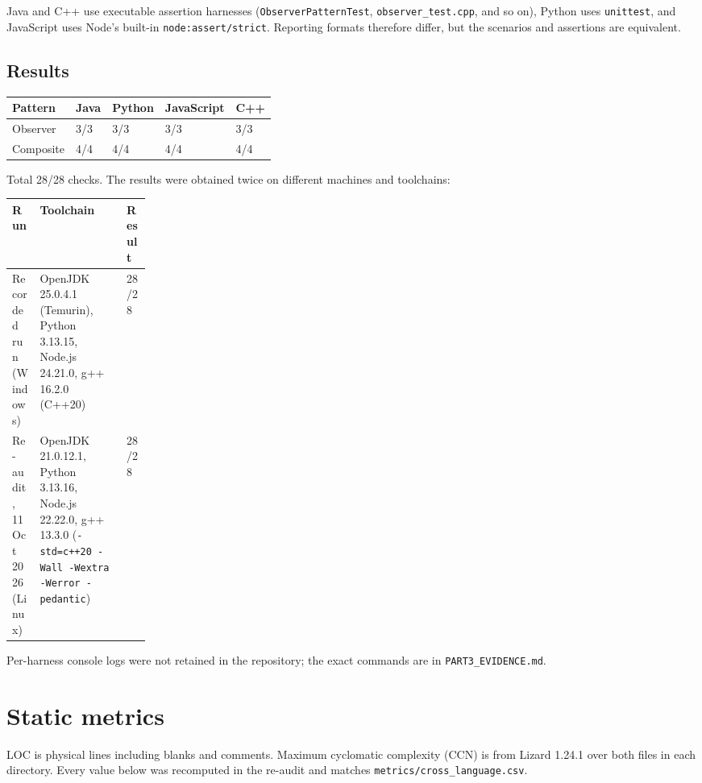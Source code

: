 \documentclass[11pt,a4paper]{article}
\newcommand{\code}[1]{\nolinkurl{#1}}
\begin{document}
Java and C++ use executable assertion harnesses (\code{ObserverPatternTest}, \code{observer_test.cpp}, and so on), Python uses \code{unittest}, and JavaScript uses Node's built-in \code{node:assert/strict}. Reporting formats therefore differ, but the scenarios and assertions are equivalent.

\subsection{Results}
\begin{tabularx}{\linewidth}{@{}lYYYY@{}}
\toprule
Pattern & Java & Python & JavaScript & C++\\
\midrule
Observer & 3/3 & 3/3 & 3/3 & 3/3\\
Composite & 4/4 & 4/4 & 4/4 & 4/4\\
\bottomrule
\end{tabularx}

Total 28/28 checks. The results were obtained twice on different machines and toolchains:

\begin{tabularx}{\linewidth}{@{}P{0.20\linewidth}YY@{}}
\toprule
Run & Toolchain & Result\\
\midrule
Recorded run (Windows) & OpenJDK 25.0.4.1 (Temurin), Python 3.13.15, Node.js 24.21.0, g++ 16.2.0 (C++20) & 28/28\\
Re-audit, 11 Oct 2026 (Linux) & OpenJDK 21.0.12.1, Python 3.13.16, Node.js 22.22.0, g++ 13.3.0 (\code{-std=c++20 -Wall -Wextra -Werror -pedantic}) & 28/28\\
\bottomrule
\end{tabularx}

Per-harness console logs were not retained in the repository; the exact commands are in \code{PART3_EVIDENCE.md}.

\section{Static metrics}
LOC is physical lines including blanks and comments. Maximum cyclomatic complexity (CCN) is from Lizard 1.24.1 over both files in each directory. Every value below was recomputed in the re-audit and matches \code{metrics/cross_language.csv}.
\end{document}
